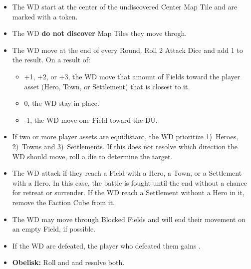 \begin{multicols}{2}
\begin{itemize}
  \item The WD start at the center of the undiscovered Center Map Tile and are marked with a  token.
  \item The WD \textbf{do not discover} Map Tiles they move throgh.
  \item The WD move at the end of every Round. Roll 2 Attack Dice and add 1 to the result. On a result of:
  \begin{itemize}
    \item +1, +2, or +3, the WD move that amount of Fields toward the player asset (Hero, Town, or Settlement) that is closest to it.
    \item 0, the WD stay in place.
    \item -1, the WD move one Field toward the DU.
  \end {itemize}
  \item If two or more player assets are equidistant, the WD prioritize 1)~Heroes, 2)~Towns and 3)~Settlements.
    If this does not resolve which direction the WD should move, roll a die to determine the target.
  \item The WD attack if they reach a Field with a Hero, a Town, or a Settlement with a Hero.
    In this case, the battle is fought until the end without a chance for retreat or surrender.
    If the WD reach a Settlement without a Hero in it, remove the Faction Cube from it.
  \item The WD may move through Blocked Fields and will end their movement on an empty Field, if possible.
  \item If the WD are defeated, the player who defeated them gains .
  \item \textbf{Obelisk:} Roll  and  and resolve both.
\end{itemize}
\end{multicols}

